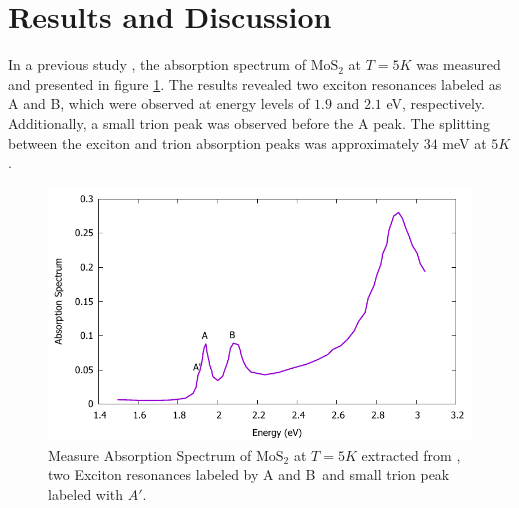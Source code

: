 \documentclass[12pt,english,a4paper]{article}
\begin{document}

\newpage
\section{Results and Discussion}
\quad In a previous study \cite{zhang_absorption_2014}, the absorption spectrum of $\mathrm{MoS}_2$ at $T = 5K$ was measured and presented in figure \ref{Absorpt Ex.}. The results revealed two exciton resonances labeled as A and B, which were observed at energy levels of $1.9$ and $2.1$ eV, respectively. Additionally, a small trion peak was observed before the A peak. The splitting between the exciton and trion absorption peaks was approximately $34$ meV at $5K$.\\
\begin{figure}
	\begin{center}
		\includegraphics[width=0.5\linewidth]{images/experiment.pdf}
		\caption[Measured absorption spectrum of $\mathrm{MoS}_2$]{Measure Absorption Spectrum of $\mathrm{MoS}_2$ at $T=5K$  extracted from \cite{zhang_absorption_2014}, two Exciton resonances labeled by A and B\, and small trion peak labeled with $A'$.}
		\label{Absorpt Ex.}
	\end{center}
\end{figure}\null
\end{document}
